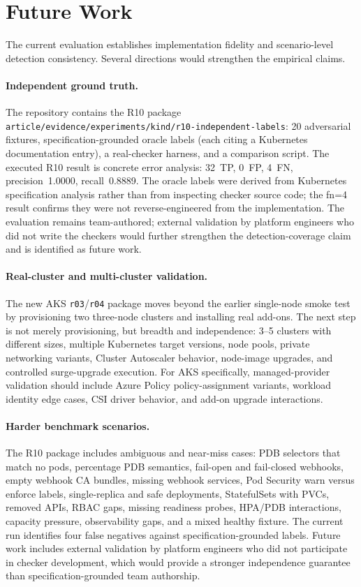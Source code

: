 \documentclass[10pt,journal]{IEEEtran}
\newcommand{\code}[1]{\texttt{#1}}
\begin{document}
\section{Future Work}
\label{sec:future-work}

The current evaluation establishes implementation fidelity and scenario-level detection consistency. Several directions would strengthen the empirical claims.

\paragraph{Independent ground truth.}
The repository contains the R10 package \code{article/evidence/experiments/kind/r10-independent-labels}: 20 adversarial fixtures, specification-grounded oracle labels (each citing a Kubernetes documentation entry), a real-checker harness, and a comparison script. The executed R10 result is concrete error analysis: 32~TP, 0~FP, 4~FN, precision~1.0000, recall~0.8889. The oracle labels were derived from Kubernetes specification analysis rather than from inspecting checker source code; the fn=4 result confirms they were not reverse-engineered from the implementation. The evaluation remains team-authored; external validation by platform engineers who did not write the checkers would further strengthen the detection-coverage claim and is identified as future work.

\paragraph{Real-cluster and multi-cluster validation.}
The new AKS \code{r03}/\code{r04} package moves beyond the earlier single-node smoke test by provisioning two three-node clusters and installing real add-ons. The next step is not merely provisioning, but breadth and independence: 3--5 clusters with different sizes, multiple Kubernetes target versions, node pools, private networking variants, Cluster Autoscaler behavior, node-image upgrades, and controlled surge-upgrade execution. For AKS specifically, managed-provider validation should include Azure Policy policy-assignment variants, workload identity edge cases, CSI driver behavior, and add-on upgrade interactions.

\paragraph{Harder benchmark scenarios.}
The R10 package includes ambiguous and near-miss cases: PDB selectors that match no pods, percentage PDB semantics, fail-open and fail-closed webhooks, empty webhook CA bundles, missing webhook services, Pod Security warn versus enforce labels, single-replica and safe deployments, StatefulSets with PVCs, removed APIs, RBAC gaps, missing readiness probes, HPA/PDB interactions, capacity pressure, observability gaps, and a mixed healthy fixture. The current run identifies four false negatives against specification-grounded labels. Future work includes external validation by platform engineers who did not participate in checker development, which would provide a stronger independence guarantee than specification-grounded team authorship.
\end{document}
